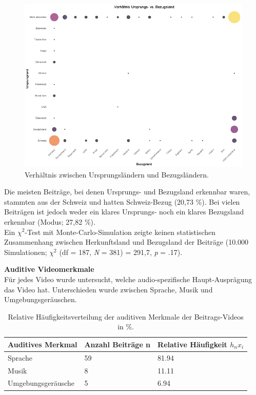 \documentclass[12pt,a4paper]{article}        %
\begin{document}
\begin{figure}[H]
  \label{fig:results_country_relation}
  \centering
  \includegraphics[width=1\linewidth]{images/country_relation_plot.png}
  \caption{Verhältnis zwischen Ursprungsländern und Bezugsländern. }
\end{figure}

Die meisten Beiträge, bei denen Ursprungs- und Bezugsland erkennbar waren, stammten aus der Schweiz und hatten Schweiz-Bezug (20,73 \%). Bei vielen Beiträgen ist jedoch weder ein klares Ursprungs- noch ein klares Bezugsland erkennbar (Modus; 27,82 \%).\\
Ein \(\chi^2\)-Test mit Monte-Carlo-Simulation zeigte keinen statistischen Zusammenhang zwischen Herkunftsland und Bezugsland der Beiträge (10.000 Simulationen; \(\chi^2\) (df = 187, \textit{N} = 381) = 291,7,  \textit{p} = .17).

\textbf{Auditive Videomerkmale}\\
Für jedes Video wurde untersucht, welche audio-spezifische Haupt-Ausprägung das Video hat. Unterschieden wurde zwischen Sprache, Musik und Umgebungsgeräuschen.
\begin{table}[H]
  \label{tab:results_auditive_specifications}
  \centering
  \begin{tabular}{|l|l|l|} \hline
    \textbf{Auditives Merkmal} & \textbf{Anzahl Beiträge n} & \textbf{Relative Häufigkeit \({h_n}{x_i}\)} \\ \hline
    Sprache & 59 & 81.94 \\ \hline
    Musik & 8 & 11.11 \\ \hline
    Umgebungsgeräusche & 5 & 6.94 \\ \hline
  \end{tabular}
  \caption{Relative Häufigkeitsverteilung der auditiven Merkmale der Beitrags-Videos in \%.}
\end{table}
\end{document}
